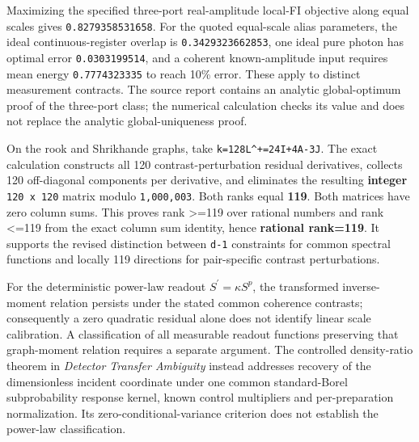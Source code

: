 \documentclass[
  10pt,
  a4paper,
]{article}
\begin{document}
Maximizing the specified three-port real-amplitude local-FI objective along equal scales gives \texttt{0.8279358531658}. For the quoted equal-scale alias parameters, the ideal continuous-register overlap is \texttt{0.3429323662853}, one ideal pure photon has optimal error \texttt{0.0303199514}, and a coherent known-amplitude input requires mean energy \texttt{0.7774323335} to reach 10\% error. These apply to distinct measurement contracts. The source report contains an analytic global-optimum proof of the three-port class; the numerical calculation checks its value and does not replace the analytic global-uniqueness proof.

On the rook and Shrikhande graphs, take \texttt{k=128L\^{}+=24I+4A-3J}. The exact calculation constructs all 120 contrast-perturbation residual derivatives, collects 120 off-diagonal components per derivative, and eliminates the resulting \textbf{integer} \texttt{120\ x\ 120} matrix modulo \texttt{1,000,003}. Both ranks equal \textbf{119}. Both matrices have zero column sums. This proves rank \textgreater=119 over rational numbers and rank \textless=119 from the exact column sum identity, hence \textbf{rational rank=119}. It supports the revised distinction between \texttt{d-1} constraints for common spectral functions and locally 119 directions for pair-specific contrast perturbations.

For the deterministic power-law readout \(S^{\prime}=\kappa S^p\), the transformed inverse-moment relation persists under the stated common coherence contrasts; consequently a zero quadratic residual alone does not identify linear scale calibration. A classification of all measurable readout functions preserving that graph-moment relation requires a separate argument. The controlled density-ratio theorem in \emph{Detector Transfer Ambiguity} instead addresses recovery of the dimensionless incident coordinate under one common standard-Borel subprobability response kernel, known control multipliers and per-preparation normalization. Its zero-conditional-variance criterion does not establish the power-law classification.
\end{document}
